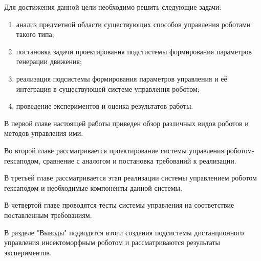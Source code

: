Для достижения данной цели необходимо решить следующие задачи:

\begin{enumerate}
    \item анализ предметной области существующих способов управления роботами такого типа;
    \item постановка задачи проектирования подстистемы формирования параметров генерации движения;
    \item реализация подсистемы формирования параметров управления и её интеграция в существующей системе управления роботом;
    \item проведение экспериментов и оценка результатов работы.
\end{enumerate}

В первой главе настоящей работы приведен обзор различных видов роботов и методов управления ими.

Во второй главе рассматривается проектирование системы управления роботом-гексаподом, сравнение с аналогом и постановка требований к реализации.

В третьей главе рассматривается этап реализации системы управлением роботом гексаподом и необходимые компоненты данной системы.

В четвертой главе проводятся тесты системы управления на соответствие поставленным требованиям.

В разделе "Выводы"{} подводятся итоги создания подсистемы дистанционного управления инсектоморфным роботом и рассматриваются результаты экспериментов.